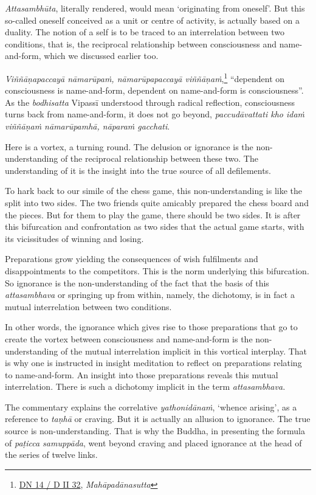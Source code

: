 \emph{Attasambhūta}, literally rendered, would mean `originating from oneself'. But this so-called oneself conceived as a unit or centre of activity, is actually based on a duality. The notion of a self is to be traced to an interrelation between two conditions, that is, the reciprocal relationship between consciousness and name-and-form, which we discussed earlier too.

\emph{Viññāṇapaccayā nāmarūpaṁ, nāmarūpapaccayā viññāṇaṁ},\footnote{\href{https://suttacentral.net/dn14/pli/ms}{DN 14 / D II 32}, \emph{Mahāpadānasutta}} ``dependent on consciousness is name-and-form, dependent on name-and-form is consciousness''. As the \emph{bodhisatta} Vipassī understood through radical reflection, consciousness turns back from name-and-form, it does not go beyond, \emph{paccudāvattati kho idaṁ viññāṇaṁ nāmarūpamhā, nāparaṁ gacchati}.

Here is a vortex, a turning round. The delusion or ignorance is the non-understanding of the reciprocal relationship between these two. The understanding of it is the insight into the true source of all defilements.

To hark back to our simile of the chess game, this non-understanding is like the split into two sides. The two friends quite amicably prepared the chess board and the pieces. But for them to play the game, there should be two sides. It is after this bifurcation and confrontation as two sides that the actual game starts, with its vicissitudes of winning and losing.

Preparations grow yielding the consequences of wish fulfilments and disappointments to the competitors. This is the norm underlying this bifurcation. So ignorance is the non-understanding of the fact that the basis of this \emph{attasambhava} or springing up from within, namely, the dichotomy, is in fact a mutual interrelation between two conditions.

In other words, the ignorance which gives rise to those preparations that go to create the vortex between consciousness and name-and-form is the non-understanding of the mutual interrelation implicit in this vortical interplay. That is why one is instructed in insight meditation to reflect on preparations relating to name-and-form. An insight into those preparations reveals this mutual interrelation. There is such a dichotomy implicit in the term \emph{attasambhava.}

The commentary explains the correlative \emph{yathonidānaṁ}, `whence arising', as a reference to \emph{taṇhā} or craving. But it is actually an allusion to ignorance. The true source is non-understanding. That is why the Buddha, in presenting the formula of \emph{paṭicca samuppāda}, went beyond craving and placed ignorance at the head of the series of twelve links.

